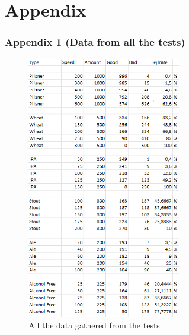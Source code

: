 \section{Appendix}

\subsubsection{Appendix 1 (Data from all the tests)}

\begin{center}
    \centering
    \begin{figure}[H]
        \hspace*{3cm}\includegraphics[width=0.6\textwidth]{img/datacollection.png}
        \caption{All the data gathered from the tests}
        \label{fig:datacollection}
    \end{figure}
\end{center}

\newpage
